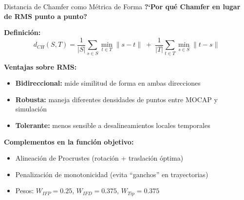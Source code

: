 \documentclass[xcolor={table,dvipsnames}]{beamer}
\begin{document}
\begin{frame}{Distancia de Chamfer como M\'etrica de Forma}
    \scriptsize
    \textbf{?`Por qu\'e Chamfer en lugar de RMS punto a punto?} \cite{borgefors1988hierarchical, fan2017chamfer}
    \vspace{0.2cm}

    \textbf{Definici\'on:}
    \begin{equation}
        d_{CH}(S,T) = \frac{1}{|S|}\sum_{s \in S} \min_{t \in T} \|s - t\| \;+\; \frac{1}{|T|}\sum_{t \in T} \min_{s \in S} \|t - s\|
    \end{equation}

    \vspace{0.1cm}
    \textbf{Ventajas sobre RMS:}
    \begin{itemize}
        \item \textbf{Bidireccional:} mide similitud de forma en ambas direcciones
        \item \textbf{Robusta:} maneja diferentes densidades de puntos entre MOCAP y simulaci\'on
        \item \textbf{Tolerante:} menos sensible a desalineamientos locales temporales
    \end{itemize}

    \vspace{0.2cm}
    \textbf{Complementos en la funci\'on objetivo:}
    \begin{itemize}
        \item Alineaci\'on de Procrustes (rotaci\'on + traslaci\'on \'optima)
        \item Penalizaci\'on de monotonicidad (evita ``ganchos'' en trayectorias)
        \item Pesos: $W_{IFP}=0.25$, $W_{IFD}=0.375$, $W_{Tip}=0.375$
    \end{itemize}
\end{frame}
\end{document}
